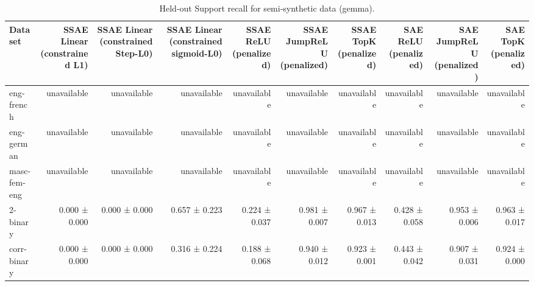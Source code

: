 \begin{table}[t]
\centering
\caption{Held-out Support recall for semi-synthetic data (gemma).}
\label{tab:semisynthetic-gemma-support-recall}
\begin{tabular}{lrrrrrrrrr}
\toprule
Dataset & SSAE Linear (constrained L1) & SSAE Linear (constrained Step-L0) & SSAE Linear (constrained sigmoid-L0) & SSAE ReLU (penalized) & SSAE JumpReLU (penalized) & SSAE TopK (penalized) & SAE ReLU (penalized) & SAE JumpReLU (penalized) & SAE TopK (penalized) \\
\midrule
eng-french & unavailable & unavailable & unavailable & unavailable & unavailable & unavailable & unavailable & unavailable & unavailable \\
eng-german & unavailable & unavailable & unavailable & unavailable & unavailable & unavailable & unavailable & unavailable & unavailable \\
masc-fem-eng & unavailable & unavailable & unavailable & unavailable & unavailable & unavailable & unavailable & unavailable & unavailable \\
2-binary & 0.000 ± 0.000 & 0.000 ± 0.000 & 0.657 ± 0.223 & 0.224 ± 0.037 & 0.981 ± 0.007 & 0.967 ± 0.013 & 0.428 ± 0.058 & 0.953 ± 0.006 & 0.963 ± 0.017 \\
corr-binary & 0.000 ± 0.000 & 0.000 ± 0.000 & 0.316 ± 0.224 & 0.188 ± 0.068 & 0.940 ± 0.012 & 0.923 ± 0.001 & 0.443 ± 0.042 & 0.907 ± 0.031 & 0.924 ± 0.000 \\
\bottomrule
\end{tabular}
\end{table}
